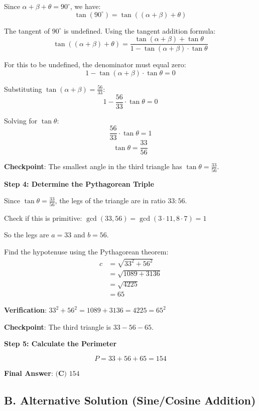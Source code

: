 \documentclass[12pt]{article}
\begin{document}
\begin{solutionbox}
Since $\alpha + \beta + \theta = 90^{\circ}$, we have:
$$\tan(90^{\circ}) = \tan((\alpha + \beta) + \theta)$$

The tangent of $90^{\circ}$ is undefined. Using the tangent addition formula:
$$\tan((\alpha + \beta) + \theta) = \frac{\tan(\alpha + \beta) + \tan\theta}{1 - \tan(\alpha + \beta) \cdot \tan\theta}$$

For this to be undefined, the denominator must equal zero:
$$1 - \tan(\alpha + \beta) \cdot \tan\theta = 0$$

Substituting $\tan(\alpha + \beta) = \frac{56}{33}$:
$$1 - \frac{56}{33} \cdot \tan\theta = 0$$

Solving for $\tan\theta$:
$$\frac{56}{33} \cdot \tan\theta = 1$$
$$\tan\theta = \frac{33}{56}$$

\textbf{Checkpoint}: The smallest angle in the third triangle has $\tan\theta = \frac{33}{56}$.

\vspace{0.3cm}

\textbf{Step 4: Determine the Pythagorean Triple}

Since $\tan\theta = \frac{33}{56}$, the legs of the triangle are in ratio $33:56$.

Check if this is primitive: $\gcd(33, 56) = \gcd(3 \cdot 11, 8 \cdot 7) = 1$ \checkmark

So the legs are $a = 33$ and $b = 56$.

Find the hypotenuse using the Pythagorean theorem:
\begin{align*}
    c &= \sqrt{33^2 + 56^2} \\
    &= \sqrt{1089 + 3136} \\
    &= \sqrt{4225} \\
    &= 65
\end{align*}

\textbf{Verification}: $33^2 + 56^2 = 1089 + 3136 = 4225 = 65^2$ \checkmark

\textbf{Checkpoint}: The third triangle is $33-56-65$.

\vspace{0.3cm}

\textbf{Step 5: Calculate the Perimeter}

$$P = 33 + 56 + 65 = 154$$

\textbf{Final Answer}: $\boxed{\textbf{(C) } 154}$

\subsection*{B. Alternative Solution (Sine/Cosine Addition)}


\end{solutionbox}
\end{document}
